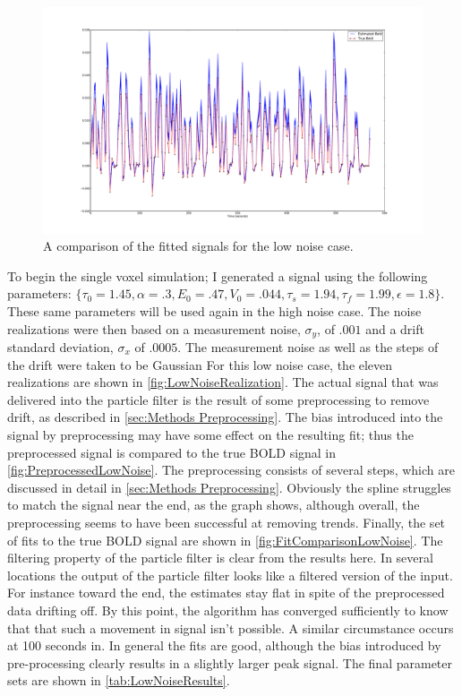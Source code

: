 \begin{figure}
\includegraphics[clip=true,trim=6cm 2cm 6cm 3.5cm,width=17cm]{images/comparison_lownoise}
\caption{A comparison of the fitted signals for the low noise case.}
\label{fig:FitComparisonLowNoise}
\end{figure}

To begin the single voxel simulation; I generated a signal using the following parameters:
$\{\tau_0 = 1.45, \alpha = .3, E_0 = .47, V_0 = .044, \tau_s = 1.94, \tau_f = 1.99, \epsilon = 1.8\}$.
These same parameters will be used again in the high noise case. The noise realizations were
then based on a measurement noise, $\sigma_y$, of $.001$ and a drift standard deviation,
$\sigma_x$ of $.0005$. The measurement noise as well as the steps of the drift
were taken to be Gaussian
For this low noise case, the eleven realizations are shown in \autoref{fig:LowNoiseRealization}.
The actual signal that was delivered into the particle filter
is the result of some preprocessing to remove drift, as described in 
\autoref{sec:Methods Preprocessing}. The bias introduced into the signal by preprocessing 
may have some effect on the resulting fit; thus the preprocessed signal is compared
to the true BOLD signal in \autoref{fig:PreprocessedLowNoise}.
The preprocessing consists of several steps, which are discussed in detail in \autoref{sec:Methods Preprocessing}.
Obviously the spline struggles to match the signal near the end, as the graph shows, although 
overall, the preprocessing seems to have been successful at removing trends. Finally, the 
set of fits to the true BOLD signal are shown in \autoref{fig:FitComparisonLowNoise}.
The filtering property of the particle filter is clear from the results here.  In several locations the output
of the particle filter looks like a filtered version of the input. For instance toward the
end, the estimates stay flat in spite of the preprocessed data drifting off. By
this point, the algorithm has converged sufficiently to know that that such a movement in
signal isn't possible. A similar circumstance occurs at 100 seconds in. 
In general the fits are good, although the bias introduced by pre-processing clearly
results in a slightly larger peak signal. The final parameter sets are shown in 
\autoref{tab:LowNoiseResults}.

